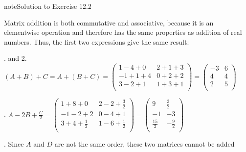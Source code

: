 \documentclass[letterpaper,10pt,english]{jupyterBook}
\begin{document}
\begin{sphinxadmonition}{note}{Solution to Exercise 12.2}



\sphinxAtStartPar
Matrix addition is both commutative and associative, because it is an elementwise operation and therefore has the same properties as addition of real numbers. Thus, the first two expressions give the same result:

. and 2. \((A+B)+C=A+(B+C)=\left(\begin{array}{cc}1-4+0 & 2+1+3 \\-1+1+4 & 0+2+2 \\3-2+1 & 1+3+1 \\\end{array}\right)=\left(\begin{array}{cc}-3 & 6 \\4 & 4 \\2 & 5 \\\end{array}\right)\)

. \(A-2 B+\frac{C}{2}=\left(\begin{array}{cc}1+8+0 & 2-2+\frac{3}{2} \\-1-2+2 & 0-4+1 \\3+4+\frac{1}{2} & 1-6+\frac{1}{2} \\\end{array}\right)=\left(\begin{array}{cc}9 & \frac{3}{2} \\-1 & -3 \\\frac{15}{2} & -\frac{9}{2} \\\end{array}\right)\)

. Since \(A\) and \(D\) are not the same order, these two matrices cannot be added
\end{sphinxadmonition}
 \label{LinearAlgebra/linear_systems_matrices/matrices:LinearAlgebra/linear_systems_matrices/matrices-solution-6}
\end{document}
